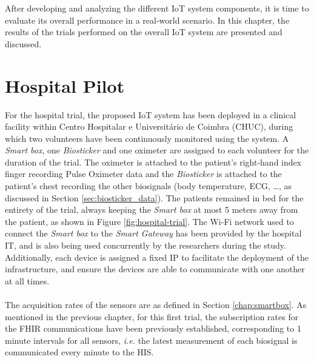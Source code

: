 

After developing and analyzing the different \acs{IoT} system components, it is time to evaluate its overall performance in a real-world scenario. In this chapter, the results of the trials performed on the overall \acs{IoT} system are presented and discussed. 

\paragraph{} 

\section{Hospital Pilot}

For the hospital trial, the proposed \acs{IoT} system has been deployed in a clinical facility within Centro Hospitalar e Universitário de Coimbra (CHUC), during which two volunteers have been continuously monitored using the system. A \textit{Smart box}, one \textit{Biosticker} and one oximeter are assigned to each volunteer for the duration of the trial. The oximeter is attached to the patient's right-hand index finger recording Pulse Oximeter data and the \textit{Biosticker} is attached to the patient's chest recording the other biosignals (body temperature, \acs{ECG}, \dots, as discussed in Section \ref{sec:biosticker_data}). The patients remained in bed for the entirety of the trial, always keeping the \textit{Smart box} at most 5 meters away from the patient, as shown in Figure \ref{fig:hospital-trial}. The Wi-Fi network used to connect the \textit{Smart box} to the \textit{Smart Gateway} has been provided by the hospital IT, and is also being used concurrently by the researchers during the study. Additionally, each device is assigned a fixed \acs{IP} to facilitate the deployment of the infrastructure, and ensure the devices are able to communicate with one another at all times.

\paragraph{} The acquisition rates of the sensors are as defined in Section \ref{chap:smartbox}. As mentioned in the previous chapter, for this first trial, the subscription rates for the \acs{FHIR} communications have been previously established, corresponding to 1 minute intervals for all sensors, \textit{i.e.} the latest measurement of each biosignal is communicated every minute to the \acs{HIS}.

